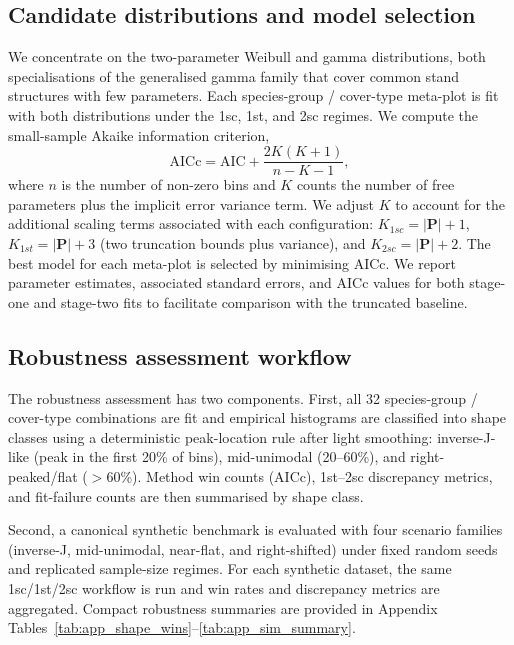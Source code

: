 \subsection{Candidate distributions and model selection}
\label{sec:methods_candidates}

We concentrate on the two-parameter Weibull and gamma distributions, both specialisations of the generalised gamma family that cover common stand structures with few parameters. Each species-group / cover-type meta-plot is fit with both distributions under the 1sc, 1st, and 2sc regimes. We compute the small-sample Akaike information criterion,
\begin{equation}
  \text{AICc} = \text{AIC} + \frac{2K(K+1)}{n - K - 1},
\end{equation}
where $n$ is the number of non-zero bins and $K$ counts the number of free parameters plus the implicit error variance term. We adjust $K$ to account for the additional scaling terms associated with each configuration: $K_{1sc} = |\bm{P}| + 1$, $K_{1st} = |\bm{P}| + 3$ (two truncation bounds plus variance), and $K_{2sc} = |\bm{P}| + 2$. The best model for each meta-plot is selected by minimising AICc. We report parameter estimates, associated standard errors, and AICc values for both stage-one and stage-two fits to facilitate comparison with the truncated baseline.

\subsection{Robustness assessment workflow}
\label{sec:methods_robustness}

The robustness assessment has two components. First, all 32 species-group / cover-type combinations are fit and empirical histograms are classified into shape classes using a deterministic peak-location rule after light smoothing: inverse-J-like (peak in the first 20\% of bins), mid-unimodal (20--60\%), and right-peaked/flat ($>$60\%). Method win counts (AICc), 1st--2sc discrepancy metrics, and fit-failure counts are then summarised by shape class.

Second, a canonical synthetic benchmark is evaluated with four scenario families (inverse-J, mid-unimodal, near-flat, and right-shifted) under fixed random seeds and replicated sample-size regimes. For each synthetic dataset, the same 1sc/1st/2sc workflow is run and win rates and discrepancy metrics are aggregated.
Compact robustness summaries are provided in Appendix Tables~\ref{tab:app_shape_wins}--\ref{tab:app_sim_summary}.
